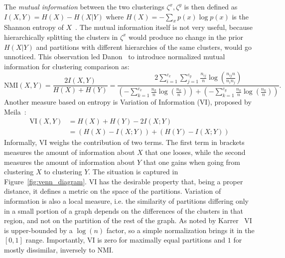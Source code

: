 The \emph{mutual information} between the two clusterings $\zeta^x,\zeta^y$ is then defined as $I(X,Y)=H(X) - H(X|Y)$ where $H(X)=-\sum_x p(x) \log p(x)$ is the Shannon entropy of $X$~\cite{cover2006}.
The mutual information itself is not very useful, because hierarchically splitting the clusters in $\zeta^x$ would produce no change in the prior $H(X|Y)$ and partitions with different hierarchies of the same clusters, would go unnoticed.
This observation led Danon~\cite{danon2005} to introduce normalized mutual information for clustering comparison as: 
\begin{equation}\label{eq:nmi}
\textrm{NMI}(X,Y) = \frac{2I(X,Y)}{H(X)+H(Y)} = \dfrac{2\sum \limits_{i=1}^{c_x} \sum \limits_{j=1}^{c_y} \frac{n_{ij}}{n} \log\left( \frac{n_{ij}n}{n_i n_j} \right)} {\left(-\sum \limits_{k=1}^{c_x} \frac{n_k}{n}\log\left(\frac{n_k}{n}\right) \right) + \left(-\sum \limits_{k=1}^{c_y} \frac{n_k}{n}\log\left(\frac{n_k}{n}\right) \right)}.
\end{equation}
Another measure based on entropy is Variation of Information (VI), proposed by Meila~\cite{meila2007}:
\begin{align}\label{eq:vi}
\textrm{VI}(X,Y) &= H(X) + H(Y) - 2I(X;Y)\nonumber \\ &= \left( H(X)-I(X;Y) \right) + \left( H(Y) - I(X;Y)\right)
\end{align}
Informally, VI weighs the contribution of two terms.
The first term in brackets measures the amount of information about $X$ that one looses, while the second measures the amount of information about $Y$ that one gains when going from clustering $X$ to clustering $Y$. The situation is captured in Figure~\ref{fig:venn_diagram}.
VI has the desirable property that, being a proper distance, it defines a metric on the space of the partitions.
Variation of information is also a local measure, i.e. the similarity of partitions differing only in a small portion of a graph depends on the differences of the clusters in that region, and not on the partition of the rest of the graph.
As noted by Karrer~\cite{karrer2008} VI is upper-bounded by a $\log(n)$ factor, so a simple normalization brings it in the $[0,1]$ range.
Importantly, VI is zero for maximally equal partitions and $1$ for mostly dissimilar, inversely to NMI.

